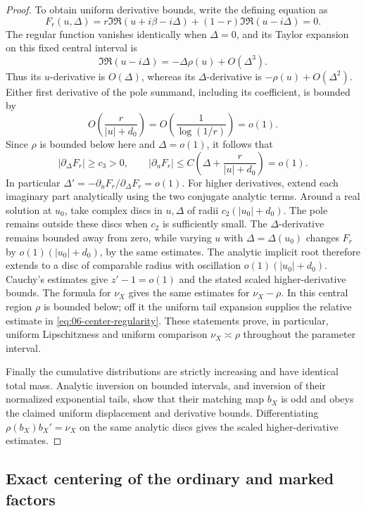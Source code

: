 \begin{proof}
To obtain uniform derivative bounds, write the defining equation as
\[
 F_r(u,\Delta)
 =r\Im\mathfrak R(u+i\beta-i\Delta)
  +(1-r)\Im\mathfrak R(u-i\Delta)=0.
\]
The regular function vanishes identically when \(\Delta=0\), and its
Taylor expansion on this fixed central interval is
\[
 \Im\mathfrak R(u-i\Delta)=-\Delta\rho(u)+O(\Delta^3).
\]
Thus its \(u\)-derivative is \(O(\Delta)\), whereas its
\(\Delta\)-derivative is \(-\rho(u)+O(\Delta^2)\).
Either first derivative of the pole summand, including its coefficient,
is bounded by
\[
 O\!\left(\frac{r}{|u|+d_0}\right)
 =O\!\left(\frac1{\log(1/r)}\right)=o(1).
\]
Since \(\rho\) is bounded below here and \(\Delta=o(1)\), it follows that
\[
 |\partial_\Delta F_r|\ge c_3>0,\qquad
 |\partial_u F_r|
 \le C\left(\Delta+\frac{r}{|u|+d_0}\right)=o(1).
\]
In particular \(\Delta'=-\partial_u F_r/\partial_\Delta F_r=o(1)\).
For higher derivatives, extend each imaginary part analytically using
the two conjugate analytic terms.  Around a real solution at \(u_0\),
take complex discs in \(u,\Delta\) of radii
\(c_2(|u_0|+d_0)\).  The pole remains outside these discs when
\(c_2\) is sufficiently small.  The \(\Delta\)-derivative remains
bounded away from zero, while varying \(u\) with \(\Delta=\Delta(u_0)\)
changes \(F_r\) by \(o(1)(|u_0|+d_0)\), by the same estimates.
The analytic implicit root therefore extends to a disc of comparable
radius with oscillation \(o(1)(|u_0|+d_0)\).  Cauchy's estimates give
\(z'-1=o(1)\) and the stated scaled higher-derivative bounds.
The formula for \(\nu_X\) gives the same estimates for
\(\nu_X-\rho\).  In this central region \(\rho\) is bounded below;
off it the uniform tail expansion supplies the relative estimate
in \eqref{eq:06-center-regularity}.  These statements prove, in
particular, uniform Lipschitzness and uniform comparison
\(\nu_X\asymp\rho\) throughout the parameter interval.

Finally the cumulative distributions are strictly increasing and
have identical total mass.  Analytic inversion on bounded
intervals, and inversion of their normalized exponential tails,
show that their matching map \(b_X\) is odd and obeys the claimed
uniform displacement and derivative bounds.  Differentiating
\(\rho(b_X)b_X'=\nu_X\) on the same analytic discs gives the scaled
higher-derivative estimates.
\end{proof}

\subsection{Exact centering of the ordinary and marked factors}

